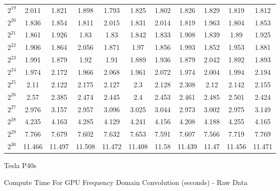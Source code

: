 \begin{center}
\begin{tabular}{c|c|c|c|c|c|c|c|c|c|c}
$2^{19}$ & 2.011 & 1.821 & 1.898 & 1.793 & 1.825 & 1.802 & 1.826 & 1.829 & 1.819 & 1.812 \\
$2^{20}$ & 1.836 & 1.854 & 1.811 & 2.015 & 1.831 & 2.014 & 1.819 & 1.963 & 1.804 & 1.853 \\
$2^{21}$ & 1.861 & 1.926 & 1.83 & 1.83 & 1.842 & 1.833 & 1.908 & 1.839 & 1.89 & 1.925 \\
$2^{22}$ & 1.906 & 1.864 & 2.056 & 1.871 & 1.97 & 1.856 & 1.993 & 1.852 & 1.953 & 1.881 \\
$2^{23}$ & 1.991 & 1.879 & 1.92 & 1.91 & 1.889 & 1.936 & 1.879 & 2.042 & 1.892 & 1.893 \\
$2^{24}$ & 1.974 & 2.172 & 1.966 & 2.068 & 1.961 & 2.072 & 1.974 & 2.004 & 1.994 & 2.194 \\
$2^{25}$ & 2.11 & 2.122 & 2.175 & 2.127 & 2.3 & 2.128 & 2.308 & 2.12 & 2.142 & 2.155 \\
$2^{26}$ & 2.57 & 2.385 & 2.474 & 2.445 & 2.4 & 2.453 & 2.461 & 2.485 & 2.501 & 2.424 \\
$2^{27}$ & 2.976 & 3.157 & 2.957 & 3.096 & 3.025 & 3.044 & 2.973 & 3.002 & 2.975 & 3.149 \\
$2^{28}$ & 4.235 & 4.163 & 4.285 & 4.129 & 4.241 & 4.156 & 4.208 & 4.188 & 4.255 & 4.165 \\
$2^{29}$ & 7.766 & 7.679 & 7.602 & 7.632 & 7.653 & 7.591 & 7.607 & 7.566 & 7.719 & 7.769 \\
$2^{30}$ & 11.466 & 11.497 & 11.508 & 11.472 & 11.408 & 11.58 & 11.439 & 11.47 & 11.456 & 11.471 
    \end{tabular}
    
     Tesla P40s
    
    Compute Time For GPU Frequency Domain Convolution (seconds) - Raw Data
    

\end{center}
